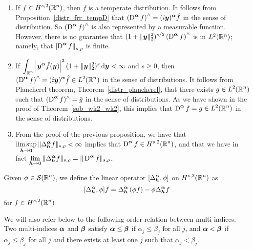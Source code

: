 \begin{rmkList} \label{ell_reg_prop3_rmk}
\begin{enumerate}
\item If $\displaystyle f \in H^{s,2}(\mathbb{R}^n)$, then $f$ is a temperate
distribution.  It follows from Proposition~\ref{distr_frr_tempD}
that $\displaystyle \left(\operatorname{D}^{{\bm{\alpha}}} f\right)^\wedge =
(i{\bm{y}})^{{\bm{\alpha}}} \hat{f}$ in the sense of distribution.  So
$\displaystyle \left(\operatorname{D}^{{\bm{\alpha}}} f\right)^\wedge$ is also represented
by a measurable function.  However, there is no guarantee that
$\displaystyle (1+\|{\bm{y}}\|_2^2)^{s/2} \left(\operatorname{D}^{{\bm{\alpha}}}
f\right)^\wedge$ is in $L^2(\mathbb{R}^n)$; namely, that
$\displaystyle \left|\operatorname{D}^{{\bm{\alpha}}} f \right\|_{s,\rho}$
is finite.
\item If $\displaystyle
\int_{\mathbb{R}^n} \left| {\bm{y}}^{{\bm{\alpha}}} \hat{f}({\bm{y}})\right|^2
(1 + \|{\bm{y}}\|_2^2)^s \,\mathrm{d}{{\bm{y}}} < \infty$ and $s \geq 0$, then
$\displaystyle \left(\operatorname{D}^{{\bm{\alpha}}} f\right)^\wedge
= (i{\bm{y}})^{{\bm{\alpha}}} \hat{f} \in L^2(\mathbb{R}^n)$ in the sense of
distributions.
It follows from Plancherel theorem, Theorem~\ref{distr_plancherel},
that there exists $\displaystyle g \in L^2(\mathbb{R}^n)$
such that $\displaystyle (\operatorname{D}^{{\bm{\alpha}}} f)^\wedge = \hat{g}$ in
the sense of distributions.  As we have shown in the proof of
Theorem~\ref{sob_wk2_wk2}, this implies that
$\displaystyle \operatorname{D}^{{\bm{\alpha}}} f = g \in L^2(\mathbb{R}^n)$ in the sense of
distributions.  
\item  From the proof of the previous proposition, we have that
$\displaystyle \limsup_{{\bm{h}}\rightarrow {\bm{0}}}
\|\Delta^{{\bm{\alpha}}}_{{\bm{h}}} f\|_{s,\rho} < \infty$ implies that
$\displaystyle \operatorname{D}^{{\bm{\alpha}}} f \in H^{s,2}(\mathbb{R}^n)$, and that we
have in fact $\displaystyle \lim_{{\bm{h}}\rightarrow {\bm{0}}}
\|\Delta^{{\bm{\alpha}}}_{{\bm{h}}} f\|_{s,\rho}
= \|\operatorname{D}^{{\bm{\alpha}}} f\|_{s,\rho}$.
\end{enumerate}
\end{rmkList}

Given $\displaystyle \phi \in \mathcal{S}(\mathbb{R}^n)$, we define the linear operator
$\displaystyle [\Delta^{{\bm{\alpha}}}_{{\bm{h}}}, \phi]$ on
$\displaystyle H^{s,2}(\mathbb{R}^n)$ as
\[
[\Delta^{{\bm{\alpha}}}_{{\bm{h}}}, \phi]f
= \Delta^{{\bm{\alpha}}}_{{\bm{h}}} \left( \phi f \right) -
\phi \Delta^{{\bm{\alpha}}}_{\bm{h}} f
\]
for $\displaystyle f \in H^{s,2}(\mathbb{R}^n)$.

We will also refer below to the following order relation between multi-indices.
Two multi-indices ${\bm{\alpha}}$ and ${\bm{\beta}}$ satisfy
${\bm{\alpha}} \leq {\bm{\beta}}$ if $\alpha_j \leq \beta_j$ for all $j$,
and ${\bm{\alpha}} < {\bm{\beta}}$ if $\alpha_j \leq \beta_j$ for all
$j$ and there exists at least one $j$ such that $\alpha_j < \beta_j$.

